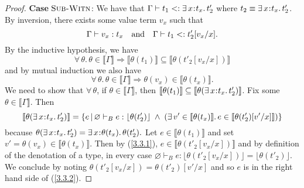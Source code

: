 \documentclass[11pt]{article}
\newcommand{\bind}{\hspace{0.05em}{:}\hspace{0.05em}} %
\newcommand{\lb}{\llbracket}         %
\newcommand{\rb}{\rrbracket}         %
\begin{document}
\begin{proof}
{\bf Case} $\textsc{Sub-Witn}$: We have that
$\Gamma \vdash t_1 <: \exists\, x\bind t_x.\, t'_2$ where $t_2 \equiv \exists\, x\bind t_x.\, t'_2$. By inversion, there exists some value term $v_x$ such that
\[
\Gamma \vdash v_x : t_x \quad {\rm and} \quad \Gamma \vdash t_1 <: t'_2[v_x/x].
\]
By the inductive hypothesis, we have
\begin{equation}\label{3.3.1}
\forall\, \theta.\, \theta\in \lb\Gamma\rb \Rightarrow \lb \theta(t_1) \rb \subseteq \lb \theta(t'_2[v_x/x]) \rb 
\end{equation}
and by mutual induction we also have
\[
\forall\, \theta.\, \theta\in \lb\Gamma\rb \Rightarrow \theta(v_x) \in \lb\theta(t_x)\rb.
\]
We need to show that $\forall\, \theta$, if $\theta \in \lb\Gamma\rb$, then $\lb\theta(t_1)\rb \subseteq \lb \theta(\exists\, x\bind t_x.\, t'_2)\rb$. Fix some $\theta \in \lb\Gamma\rb.$ Then
\begin{equation} \label{3.3.2}
\lb \theta(\exists\, x\bind t_x.\, t'_2)\rb
= \{ e \,|\, \varnothing \vdash_B e : \lfloor \theta(t'_2)\rfloor \;\wedge\; 
  (\exists\, v' \in \lb \theta(t_x)\rb.\, e \in\lb \theta(t'_2)[v'/x]\rb)\}
\end{equation}
because $\theta(\exists\, x\bind t_x.\, t'_2) = \exists\, x\bind\theta(t_x).\, \theta(t'_2).$
Let $e \in \lb\theta(t_1)\rb$ and set $v' = \theta(v_x) \in \lb\theta(t_x)\rb.$ Then by (\ref{3.3.1}), $e \in \lb\theta(t'_2[v_x/x])\rb$ and by definition of the denotation of a type, in every case $\varnothing \vdash_B e : \lfloor \theta(t'_2[v_x/x])\rfloor = \lfloor\theta(t'_2)\rfloor$. We conclude by noting $\theta(t'_2[v_x/x]) = \theta(t'_2)[v'/x]$ and so $e$ is in the right hand side of (\ref{3.3.2}).


\end{proof}
\end{document}
